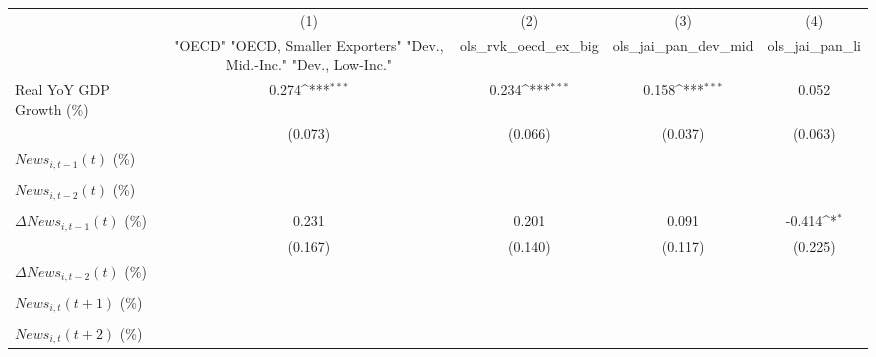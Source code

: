 {
\def\sym#1{\ifmmode^{#1}\else\(^{#1}\)\fi}
\begin{tabular}{l*{4}{c}}
\toprule
                    &\multicolumn{1}{c}{(1)}&\multicolumn{1}{c}{(2)}&\multicolumn{1}{c}{(3)}&\multicolumn{1}{c}{(4)}\\
                    &\multicolumn{1}{c}{ "OECD" "OECD, Smaller Exporters" "Dev., Mid.-Inc." "Dev., Low-Inc."}&\multicolumn{1}{c}{ols_rvk_oecd_ex_big}&\multicolumn{1}{c}{ols_jai_pan_dev_mid}&\multicolumn{1}{c}{ols_jai_pan_li}\\
\midrule
Real YoY GDP Growth (\%)&       0.274\sym{***}&       0.234\sym{***}&       0.158\sym{***}&       0.052         \\
                    &     (0.073)         &     (0.066)         &     (0.037)         &     (0.063)         \\
\addlinespace
$ News_{i,t-1}(t)$ (\%)&                     &                     &                     &                     \\
                    &                     &                     &                     &                     \\
\addlinespace
$ News_{i,t-2}(t)$ (\%)&                     &                     &                     &                     \\
                    &                     &                     &                     &                     \\
\addlinespace
$ \Delta News_{i,t-1}(t)$ (\%)&       0.231         &       0.201         &       0.091         &      -0.414\sym{*}  \\
                    &     (0.167)         &     (0.140)         &     (0.117)         &     (0.225)         \\
\addlinespace
$ \Delta News_{i,t-2}(t)$ (\%)&                     &                     &                     &                     \\
                    &                     &                     &                     &                     \\
\addlinespace
$ News_{i,t}(t+1)$ (\%)&                     &                     &                     &                     \\
                    &                     &                     &                     &                     \\
\addlinespace
$ News_{i,t}(t+2)$ (\%)&                     &                     &                     &                     \\

\end{tabular}}
